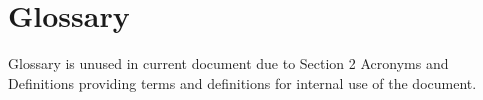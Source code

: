 \chapter{Glossary}
Glossary is unused in current document due to Section 2 Acronyms and Definitions
providing terms and definitions for internal use of the document.